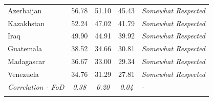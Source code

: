 \documentclass[]{article}
\begin{document}
\begin{table}[!htb]
{\begin{tabular}{@{}lcccl@{}}
            Azerbaijan & 56.78                                                                                  & 51.10                                                                                             & 45.43                                                                                               & \textit{Somewhat Respected}                        \\
            Kazakhstan & 52.24                                                                                  & 47.02                                                                                             & 41.79                                                                                               & \textit{Somewhat Respected}                        \\
            Iraq       & 49.90                                                                                  & 44.91                                                                                             & 39.92                                                                                               & \textit{Somewhat Respected}                        \\
            Guatemala  & 38.52                                                                                  & 34.66                                                                                             & 30.81                                                                                               & \textit{Somewhat Respected}                        \\
            Madagascar & 36.67                                                                                  & 33.00                                                                                             & 29.34                                                                                               & \textit{Somewhat Respected}                        \\
            Venezuela  & 34.76                                                                                  & 31.29                                                                                             & 27.81                                                                                               & \textit{Somewhat Respected}                        \\ \toprule
            \textit{Correlation - FoD}  & \textit{0.38}                                                                                  & \textit{0.20}                                                                                            & \textit{0.04}                                                                                               & -                        \\ \bottomrule         \\[-1em]

\end{tabular}}
\end{table}
\end{document}
